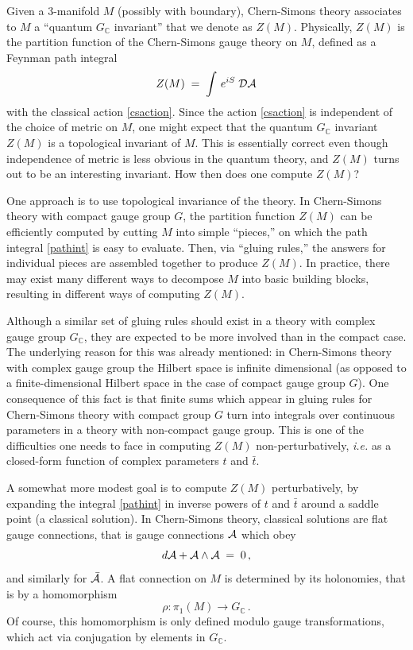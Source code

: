 \documentclass[hyper]{JHEP3}
\def\CA {{\cal A}}
\def\CD {{\cal D}}
\newcommand{\C}{{\mathbb{C}}}
\newcommand\be{\begin{equation}}
\newcommand\ee{\end{equation}}
\def\={\;=\;}
\begin{document}
Given a 3-manifold $M$ (possibly with boundary), Chern-Simons theory
associates to $M$ a ``quantum $G_{\C}$ invariant'' that we denote as $Z(M)$.
Physically, $Z(M)$ is the partition function of the Chern-Simons
gauge theory on $M$, defined as a Feynman path integral
  \be\label{pathint} Z (M) \= \int \,e^{iS}\;\CD\CA  \ee
with the classical action \eqref{csaction}.
Since the action \eqref{csaction} is independent
of the choice of metric on $M$, one might expect that
the quantum $G_{\C}$ invariant $Z(M)$ is a topological invariant of $M$.
This is essentially correct even though independence of metric is less
obvious in the quantum theory, and $Z(M)$ turns out to be an interesting invariant.
How then does one compute $Z(M)$?

One approach is to use topological invariance of the theory.
In Chern-Simons theory with compact gauge group $G$,
the partition function $Z(M)$ can be efficiently computed
by cutting $M$ into simple ``pieces,'' on which the path
integral \eqref{pathint} is easy to evaluate.
Then, via ``gluing rules,'' the answers for individual
pieces are assembled together to produce $Z(M)$.
In practice, there may exist many different ways to decompose $M$
into basic building blocks, resulting in different ways of
computing $Z(M)$.

Although a similar set of gluing rules should exist in
a theory with complex gauge group $G_{\C}$, they are expected
to be more involved than in the compact case.
The underlying reason for this was
already mentioned: in Chern-Simons theory with complex
gauge group the Hilbert space is infinite dimensional (as opposed to
a finite-dimensional Hilbert space in the case of compact gauge group $G$).
One consequence of this fact is that finite sums which appear in
gluing rules for Chern-Simons theory with compact group $G$
turn into integrals over continuous parameters in a theory
with non-compact gauge group.
This is one of the difficulties one needs to face in computing
$Z(M)$ non-perturbatively, {\it i.e.} as a closed-form function
of complex parameters $t$ and $\bar t$.

A somewhat more modest goal is to compute $Z(M)$
perturbatively, by expanding the integral \eqref{pathint}
in inverse powers of $t$ and $\bar t$ around a saddle point
(a classical solution).
In Chern-Simons theory, classical solutions are flat gauge
connections, that is gauge connections $\CA$ which obey
\be
d \CA + \CA \wedge \CA \= 0\,,
\label{aflat}
\ee
and similarly for $\bar \CA$.
A flat connection on $M$ is determined
by its holonomies, that is by a homomorphism
\be
\rho : \pi_1 (M) \to G_{\C}\,.
\label{rhofirst}
\ee
Of course, this homomorphism is only defined modulo gauge transformations,
which act via conjugation by elements in $G_{\C}$.
\end{document}
